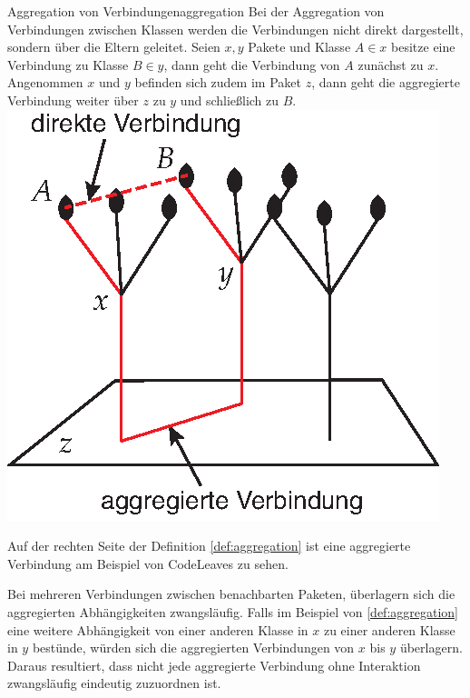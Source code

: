 \begin{splitbox}{Aggregation von Verbindungen}{aggregation}
Bei der Aggregation von Verbindungen zwischen Klassen werden die Verbindungen nicht direkt dargestellt, sondern über die Eltern geleitet. Seien $x, y$ Pakete und Klasse $A \in x$ besitze eine Verbindung zu Klasse $B \in y$, dann geht die Verbindung von $A$ zunächst zu $x$. Angenommen $x$ und $y$ befinden sich zudem im Paket $z$, dann geht die aggregierte Verbindung weiter über $z$ zu $y$ und schließlich zu $B$.
\tcblower
\includegraphics[width=\linewidth]{figures/aggregation}
\end{splitbox}

Auf der rechten Seite der Definition \ref{def:aggregation} ist eine aggregierte Verbindung am Beispiel von CodeLeaves zu sehen.

Bei mehreren Verbindungen zwischen benachbarten Paketen, überlagern sich die aggregierten Abhängigkeiten zwangsläufig. Falls im Beispiel von \ref{def:aggregation} eine weitere Abhängigkeit von einer anderen Klasse in $x$ zu einer anderen Klasse in $y$ bestünde, würden sich die aggregierten Verbindungen von $x$ bis $y$ überlagern. Daraus resultiert, dass nicht jede aggregierte Verbindung ohne Interaktion zwangsläufig eindeutig zuzuordnen ist.

